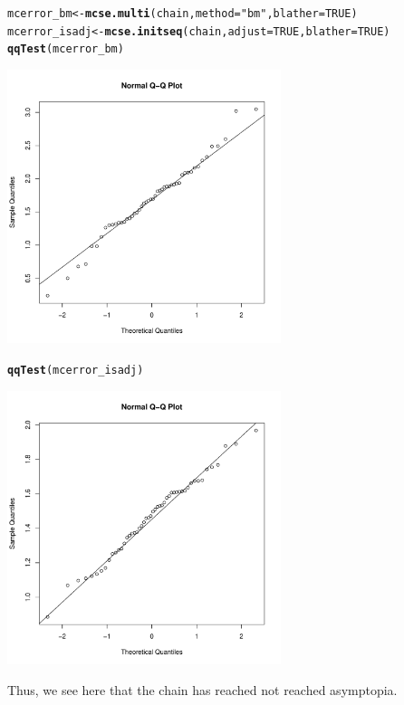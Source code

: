 \documentclass[11pt]{article}\usepackage[]{graphicx}\usepackage[]{color}
\makeatletter
\newcommand{\hlnum}[1]{\textcolor[rgb]{0.686,0.059,0.569}{#1}}%
\newcommand{\hlstr}[1]{\textcolor[rgb]{0.192,0.494,0.8}{#1}}%
\newcommand{\hlstd}[1]{\textcolor[rgb]{0.345,0.345,0.345}{#1}}%
\newcommand{\hlkwb}[1]{\textcolor[rgb]{0.69,0.353,0.396}{#1}}%
\newcommand{\hlkwc}[1]{\textcolor[rgb]{0.333,0.667,0.333}{#1}}%
\newcommand{\hlkwd}[1]{\textcolor[rgb]{0.737,0.353,0.396}{\textbf{#1}}}%
\newenvironment{kframe}{%
 \def\at@end@of@kframe{}%
 \ifinner\ifhmode%
  \def\at@end@of@kframe{\end{minipage}}%
  \begin{minipage}{\columnwidth}%
 \fi\fi%
 \def\FrameCommand##1{\hskip\@totalleftmargin \hskip-\fboxsep
 \colorbox{shadecolor}{##1}\hskip-\fboxsep
     \hskip-\linewidth \hskip-\@totalleftmargin \hskip\columnwidth}%
 \MakeFramed {\advance\hsize-\width
   \@totalleftmargin\z@ \linewidth\hsize
   \@setminipage}}%
 {\par\unskip\endMakeFramed%
 \at@end@of@kframe}
\newenvironment{knitrout}{}{} %
\makeatother
\begin{document}
\begin{knitrout}
\color{fgcolor}\begin{kframe}
\begin{alltt}
\hlstd{mcerror_bm} \hlkwb{<-} \hlkwd{mcse.multi}\hlstd{(chain,} \hlkwc{method} \hlstd{=} \hlstr{"bm"}\hlstd{,} \hlkwc{blather} \hlstd{=} \hlnum{TRUE}\hlstd{)}
\hlstd{mcerror_isadj} \hlkwb{<-} \hlkwd{mcse.initseq}\hlstd{(chain,} \hlkwc{adjust} \hlstd{=} \hlnum{TRUE}\hlstd{,} \hlkwc{blather} \hlstd{=} \hlnum{TRUE}\hlstd{)}
\hlkwd{qqTest}\hlstd{(mcerror_bm)}
\end{alltt}
\end{kframe}
\includegraphics[width=8cm]{figure/qq-1} 
\begin{kframe}\begin{alltt}
\hlkwd{qqTest}\hlstd{(mcerror_isadj)}
\end{alltt}
\end{kframe}
\includegraphics[width=8cm]{figure/qq-2} 

\end{knitrout}

Thus, we see here that the chain has reached not reached asymptopia. 


\end{document}
